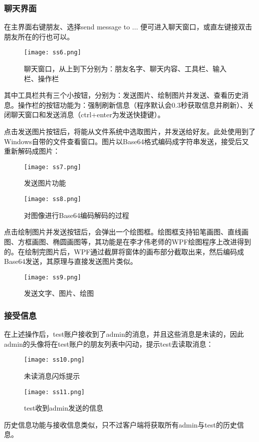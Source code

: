 \documentclass[a4paper,11pt]{article}
\begin{document}
        \subsubsection{聊天界面}
            在主界面右键朋友、选择send message to ... 便可进入聊天窗口，或直左键接双击朋友所在的行也可以。\par
            \begin{figure}[H]
                \centering
                \texttt{[image: ss6.png]}
                \caption{聊天窗口，从上到下分别为：朋友名字、聊天内容、工具栏、输入栏、操作栏}
            \end{figure}
            其中工具栏共有三个小按钮，分别为：发送图片、绘制图片并发送、查看历史消息。操作栏的按钮功能为：强制刷新信息（程序默认会0.3秒获取信息并刷新）、关闭聊天窗口和发送消息（ctrl+enter为发送快捷键）。\par
            点击发送图片按钮后，将能从文件系统中选取图片，并发送给好友。此处使用到了Windows自带的文件查看窗口。图片以Base64格式编码成字符串发送，接受后又重新解码成图片：\par
            \begin{figure}[H]
                \centering
                \texttt{[image: ss7.png]}
                \caption{发送图片功能}
            \end{figure}
            \begin{figure}[H]
                \centering
                \texttt{[image: ss8.png]}
                \caption{对图像进行Base64编码解码的过程}
            \end{figure}
            点击绘制图片并发送按钮后，会弹出一个绘图框。绘图框支持铅笔画图、直线画图、方框画图、椭圆画图等，其功能是在李才伟老师\textsuperscript{\cite{5}}的WPF绘图程序上改进得到的。在绘制完图片后，WPF通过截屏将窗体的画布部分截取出来，然后编码成Base64发送，其原理与直接发送图片类似。\par
            \begin{figure}[H]
                \centering
                \texttt{[image: ss9.png]}
                \caption{发送文字、图片、绘图}
            \end{figure}
        \subsubsection{接受信息}
            在上述操作后，test账户接收到了admin的消息，并且这些消息是未读的，因此admin的头像将在test账户的朋友列表中闪动，提示test去读取消息：\par
             \begin{figure}[H]
                \centering
                \texttt{[image: ss10.png]}
                \caption{未读消息闪烁提示}
            \end{figure}
            \begin{figure}[H]
                \centering
                \texttt{[image: ss11.png]}
                \caption{test收到admin发送的信息}
            \end{figure}
            历史信息功能与接收信息类似，只不过客户端将获取所有admin与test的历史信息。
\end{document}
